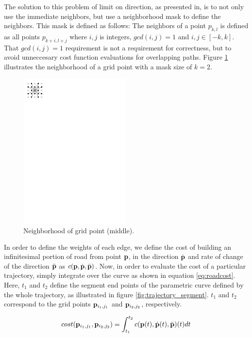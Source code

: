 The solution to this problem of limit on direction, as presented in\cite{roadgen}, is to not only use the immediate neighbors, but use a neighborhood mask to define the neighbors. This mask is defined as follows: The neighbors of a point $p_{k,l}$ is defined as all points $p_{k+i,l+j}$ where $i,j$ is integers, $gcd(i,j) = 1$ and $i,j \in [-k,k]$. That $gcd(i,j)=1$ requirement is not a requirement for correctness, but to avoid unneccesary cost function evaluations for overlapping paths. Figure \ref{fig:neighbormask} illustrates the neighborhood of a grid point with a mask size of $k=2$.

\begin{figure}[ht]
\centering
\includegraphics[width=0.5\textwidth]{figure/neighbormask}
\caption{Neighborhood of grid point (middle).}
\label{fig:neighbormask}
\end{figure}

In order to define the weights of each edge, we define the cost of building an infinitesimal portion of road from point ${\mathbf p}$, in the direction $\dot{\mathbf p}$ and rate of change of the direction $\ddot{\mathbf p}$ as $c({\mathbf p}, \dot{{\mathbf p}}, \ddot{{\mathbf p}})$. Now, in order to evaluate the cost of a particular trajectory, simply integrate over the curve as shown in equation \ref{eq:roadcost}. Here, $t_1$ and $t_2$ define the segment end points of the parametric curve defined by the whole trajectory, as illustrated in figure \ref{fig:trajectory_segment}. $t_1$ and $t_2$ correspond to the grid points ${\mathbf p}_{i_1,j_1}$ and ${\mathbf p}_{i_2,j_2}$, respectively.

\begin{equation}
cost({\mathbf p}_{i_1,j_1}, {\mathbf p}_{i_2,j_2}) = \int_{t_1}^{t_2} c({\mathbf p}(t), \dot{{\mathbf p}}(t), \ddot{{\mathbf p}})(t) dt
\label{eq:roadcost}
\end{equation}

